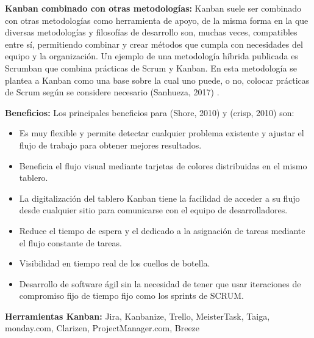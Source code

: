 \documentclass[../Main.tex]{subfiles}
\begin{document}
\begin{justify}
\textbf{Kanban combinado con otras metodologías:} Kanban suele ser combinado con otras metodologías como herramienta de apoyo, de la misma forma en la que diversas metodologías y filosofías de desarrollo son, muchas veces, compatibles entre sí, permitiendo combinar y crear métodos que cumpla con necesidades del equipo y la organización. Un ejemplo de una metodología híbrida publicada es Scrumban que combina prácticas de Scrum y Kanban. En esta metodología se plantea a Kanban como una base sobre la cual uno puede, o no, colocar prácticas de Scrum según se considere necesario (Sanhueza, 2017) \cite{31}.
\end{justify}\par

\begin{justify}
\textbf{Beneficios:} Los principales beneficios para (Shore, 2010) \cite{32} y (crisp, 2010) \cite{33} son:
\end{justify}\par

\begin{itemize}
	\item Es muy flexible y permite detectar cualquier problema existente y ajustar el flujo de trabajo para obtener mejores resultados.  \par

	\item Beneficia el flujo visual mediante tarjetas de colores distribuidas en el mismo tablero.   \par

	\item La digitalización del tablero Kanban tiene la facilidad de acceder a su flujo desde cualquier sitio para comunicarse con el equipo de desarrolladores.   \par

    \item Reduce el tiempo de espera y el dedicado a la asignación de tareas mediante el flujo constante de tareas.\par
    
	\item Visibilidad en tiempo real de los cuellos de botella. \par
	
	\item Desarrollo de software ágil sin la necesidad de tener que usar iteraciones de compromiso fijo de tiempo fijo como los sprints de SCRUM.
\end{itemize}\par

\begin{justify}
\textbf{Herramientas Kanban:} Jira, Kanbanize, Trello, MeisterTask, Taiga, monday.com, Clarizen, ProjectManager.com, Breeze
\end{justify}\par
\end{document}

